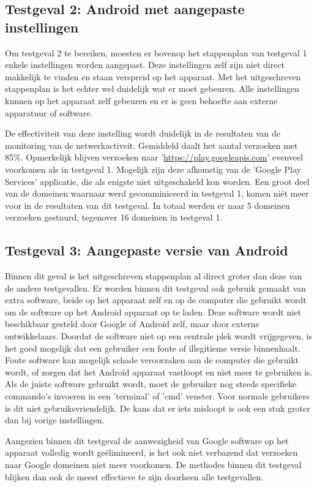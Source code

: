 \subsection{Testgeval 2: Android met aangepaste instellingen}
Om testgeval 2 te bereiken, moesten er bovenop het stappenplan van testgeval 1 enkele instellingen worden aangepast. Deze instellingen zelf zijn niet direct makkelijk te vinden en staan verspreid op het apparaat. Met het uitgeschreven stappenplan is het echter wel duidelijk wat er moet gebeuren. Alle instellingen kunnen op het apparaat zelf gebeuren en er is geen behoefte aan externe apparatuur of software.

De effectiviteit van deze instelling wordt duidelijk in de resultaten van de monitoring van de netwerkactiveit. Gemiddeld daalt het aantal verzoeken met 85\%. Opmerkelijk blijven verzoeken naar '\url{https://play.googleapis.com}' evenveel voorkomen als in testgeval 1. Mogelijk zijn deze afkomstig van de 'Google Play Services' applicatie, die als enigste niet uitgeschakeld kon worden. Een groot deel van de domeinen waarnaar werd gecomminiceerd in testgeval 1, komen niét meer voor in de resultaten van dit testgeval. In totaal werden er naar 5 domeinen verzoeken gestuurd, tegenover 16 domeinen in testgeval 1.

\subsection{Testgeval 3: Aangepaste versie van Android}
Binnen dit geval is het uitgeschreven stappenplan al direct groter dan deze van de andere testgevallen. Er worden binnen dit testgeval ook gebruik gemaakt van extra software, beide op het apparaat zelf en op de computer die gebruikt wordt om de software op het Android apparaat op te laden. Deze software wordt niet beschikbaar gesteld door Google of Android zelf, maar door externe ontwikkelaars. Doordat de software niet op een centrale plek wordt vrijgegeven, is het goed mogelijk dat een gebruiker een foute of illegitieme versie binnenhaalt. Foute software kan mogelijk schade veroorzaken aan de computer die gebruikt wordt, of zorgen dat het Android apparaat vastloopt en niet meer te gebruiken is. Als de juiste software gebruikt wordt, moet de gebruiker nog steeds specifieke commando's invoeren in een 'terminal' of 'cmd' venster. Voor normale gebruikers is dit niet gebruiksvriendelijk. De kans dat er iets misloopt is ook een stuk groter dan bij vorige instellingen.

Aangezien binnen dit testgeval de aanwezigheid van Google software op het apparaat volledig wordt geëlimineerd, is het ook niet verbazend dat  verzoeken naar Google domeinen niet meer voorkomen. De methodes binnen dit testgeval blijken dan ook de meest effectieve te zijn doorheen alle testgevallen. 

